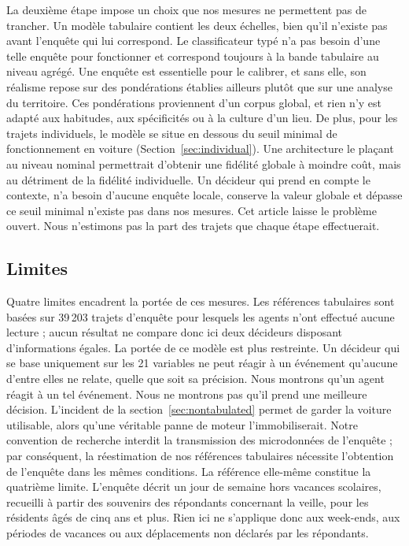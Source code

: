 La deuxième étape impose un choix que nos mesures ne permettent pas de trancher. Un modèle tabulaire contient les deux échelles, bien qu'il n'existe pas avant l'enquête qui lui correspond. Le classificateur typé n'a pas besoin d'une telle enquête pour fonctionner et correspond toujours à la bande tabulaire au niveau agrégé. Une enquête est essentielle pour le calibrer, et sans elle, son réalisme repose sur des pondérations établies ailleurs plutôt que sur une analyse du territoire. Ces pondérations proviennent d'un corpus global, et rien n'y est adapté aux habitudes, aux spécificités ou à la culture d'un lieu. De plus, pour les trajets individuels, le modèle se situe en dessous du seuil minimal de fonctionnement en voiture (Section~\ref{sec:individual}). Une architecture le plaçant au niveau nominal permettrait d'obtenir une fidélité globale à moindre coût, mais au détriment de la fidélité individuelle. Un décideur qui prend en compte le contexte, n'a besoin d'aucune enquête locale, conserve la valeur globale et dépasse ce seuil minimal n'existe pas dans nos mesures. Cet article laisse le problème ouvert. Nous n'estimons pas la part des trajets que chaque étape effectuerait.

\subsection{Limites}
\label{sec:limitations}

Quatre limites encadrent la portée de ces mesures. Les références tabulaires sont basées sur 39\,203 trajets d'enquête pour lesquels les agents n'ont effectué aucune lecture ; aucun résultat ne compare donc ici deux décideurs disposant d'informations égales. La portée de ce modèle est plus restreinte. Un décideur qui se base uniquement sur les 21 variables ne peut réagir à un événement qu'aucune d'entre elles ne relate, quelle que soit sa précision. Nous montrons qu'un agent réagit à un tel événement. Nous ne montrons pas qu'il prend une meilleure décision. L'incident de la section~\ref{sec:nontabulated} permet de garder la voiture utilisable, alors qu'une véritable panne de moteur l'immobiliserait. Notre convention de recherche interdit la transmission des microdonnées de l'enquête ; par conséquent, la réestimation de nos références tabulaires nécessite l'obtention de l'enquête dans les mêmes conditions. La référence elle-même constitue la quatrième limite. L'enquête décrit un jour de semaine hors vacances scolaires, recueilli à partir des souvenirs des répondants concernant la veille, pour les résidents âgés de cinq ans et plus. Rien ici ne s'applique donc aux week-ends, aux périodes de vacances ou aux déplacements non déclarés par les répondants.

